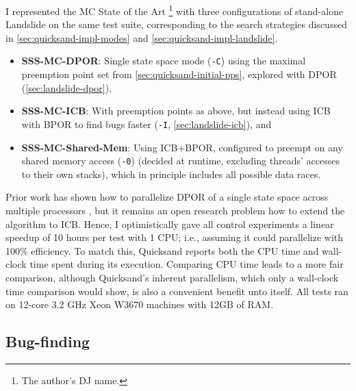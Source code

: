 I represented the MC State of the Art%
\footnote{The author's DJ name.}
with three configurations of stand-alone Landslide on the same test suite,
corresponding to the search strategies discussed in \cref{sec:quicksand-impl-modes} and \cref{sec:quicksand-impl-landslide}.

\begin{itemize}
	\item {\bf SSS-MC-DPOR}: Single state space mode ({\tt -C})
		using the maximal preemption point set from \cref{sec:quicksand-initial-pps},
		explored with DPOR (\cref{sec:landslide-dpor}),
        \item {\bf SSS-MC-ICB}: With preemption points as above,
		but instead using ICB \cite{chess-icb} with BPOR \cite{bpor} to find bugs faster
		({\tt -I}, \cref{sec:landslide-icb}), and
        \item {\bf SSS-MC-Shared-Mem}:
		Using ICB+BPOR, configured to preempt on any shared memory access ({\tt -0})
                (decided at runtime, excluding threads' accesses to their own stacks),
                which in principle includes all possible data races.
\end{itemize}

Prior work has shown how to parallelize DPOR of a single state space across multiple processors \cite{parallel-dpor},
but it remains an open research problem how to extend the algorithm to ICB.
Hence, I optimistically gave all control experiments a linear speedup of 10 hours per test with 1 CPU;
i.e., assuming it could parallelize with 100\% efficiency.
To match this,
Quicksand reports both the CPU time and wall-clock time spent during its execution.
Comparing CPU time leads to a more fair comparison,
although Quicksand's inherent parallelism, which only a wall-clock time comparison would show,
is also a convenient benefit unto itself.
All tests ran on 12-core 3.2 GHz Xeon W3670 machines with 12GB of RAM.


\subsection{Bug-finding}
\label{sec:quicksand-eval-bugs}

